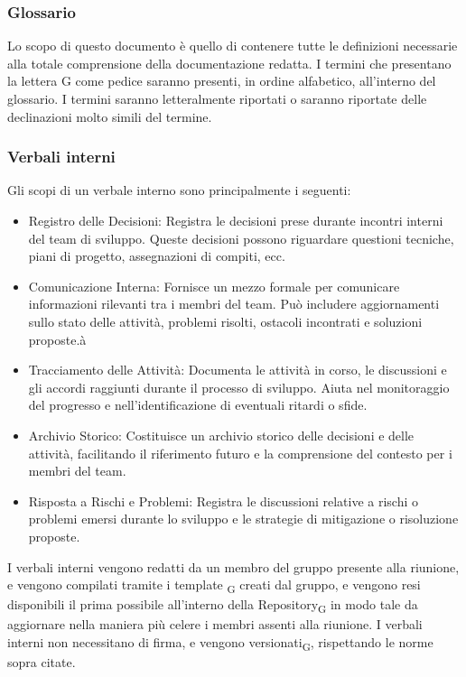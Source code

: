 \documentclass{article}
\begin{document}
\subsubsection*{Glossario}
Lo scopo di questo documento è quello di contenere tutte le definizioni necessarie alla totale comprensione della documentazione redatta. I termini che presentano la lettera G come pedice saranno presenti, in ordine alfabetico, all'interno del glossario. I termini saranno letteralmente riportati o saranno riportate delle declinazioni molto simili del termine. 

\subsubsection{Verbali interni}
Gli scopi di un verbale interno sono principalmente i seguenti:
\begin{itemize}
    \item Registro delle Decisioni: Registra le decisioni prese durante incontri interni del team di sviluppo. Queste decisioni possono riguardare questioni tecniche, piani di progetto, assegnazioni di compiti, ecc.
    \item Comunicazione Interna: Fornisce un mezzo formale per comunicare informazioni rilevanti tra i membri del team. Può includere aggiornamenti sullo stato delle attività, problemi risolti, ostacoli incontrati e soluzioni proposte.à
    \item Tracciamento delle Attività: Documenta le attività in corso, le discussioni e gli accordi raggiunti durante il processo di sviluppo. Aiuta nel monitoraggio del progresso e nell'identificazione di eventuali ritardi o sfide.
    \item Archivio Storico: Costituisce un archivio storico delle decisioni e delle attività, facilitando il riferimento futuro e la comprensione del contesto per i membri del team.
    \item Risposta a Rischi e Problemi: Registra le discussioni relative a rischi o problemi emersi durante lo sviluppo e le strategie di mitigazione o risoluzione proposte.
\end{itemize}

I verbali interni vengono redatti da un membro del gruppo presente alla riunione, e vengono compilati tramite i template \textsubscript{G} creati dal gruppo, e vengono resi disponibili il prima possibile all'interno della Repository\textsubscript{G} in modo tale da aggiornare nella maniera più celere i membri assenti alla riunione. I verbali interni non necessitano di firma, e vengono versionati\textsubscript{G}, rispettando le norme sopra citate.
\end{document}
